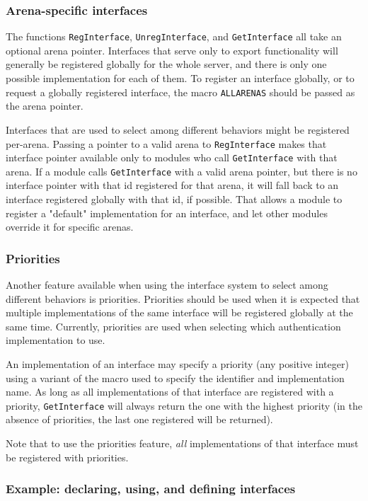 \documentclass{article}
\begin{document}
\subsubsection{Arena-specific interfaces}

The functions \verb/RegInterface/, \verb/UnregInterface/, and
\verb/GetInterface/ all take an optional arena pointer. Interfaces that
serve only to export functionality will generally be registered globally
for the whole server, and there is only one possible implementation for
each of them. To register an interface globally, or to request a
globally registered interface, the macro \verb/ALLARENAS/ should be
passed as the arena pointer.

Interfaces that are used to select among different behaviors might be
registered per-arena. Passing a pointer to a valid arena to
\verb/RegInterface/ makes that interface pointer available only to
modules who call \verb/GetInterface/ with that arena. If a module calls
\verb/GetInterface/ with a valid arena pointer, but there is no
interface pointer with that id registered for that arena, it will fall
back to an interface registered globally with that id, if possible. That
allows a module to register a "default" implementation for an interface,
and let other modules override it for specific arenas.


\subsubsection{Priorities}

Another feature available when using the interface system to select
among different behaviors is priorities. Priorities should be used when
it is expected that multiple implementations of the same interface will
be registered globally at the same time. Currently, priorities are used
when selecting which authentication implementation to use.

An implementation of an interface may specify a priority (any positive
integer) using a variant of the macro used to specify the identifier and
implementation name. As long as all implementations of that interface
are registered with a priority, \verb/GetInterface/ will always return
the one with the highest priority (in the absence of priorities, the
last one registered will be returned).

Note that to use the priorities feature, \emph{all} implementations of
that interface must be registered with priorities.


\subsubsection{Example: declaring, using, and defining interfaces}
\end{document}
